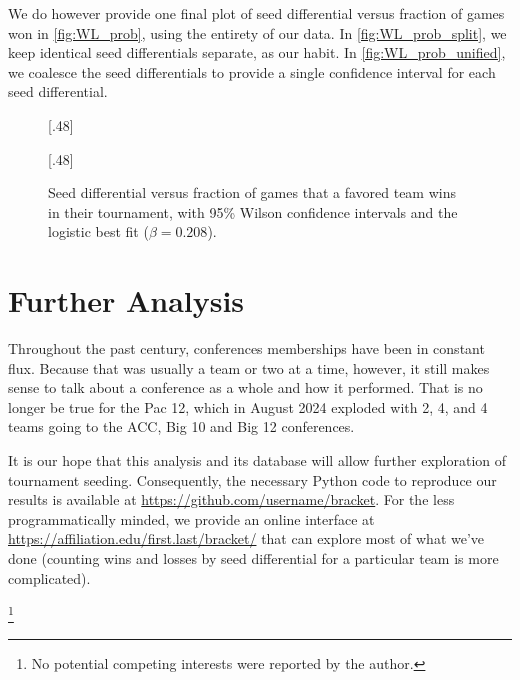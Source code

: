 \documentclass{article}
\newcommand\githuburl{https://github.com/username/bracket}
\newcommand\interfaceurl{https://affiliation.edu/first.last/bracket/}
\begin{document}
We do however provide one final plot of seed differential versus fraction of games won in \autoref{fig:WL_prob}, using the entirety of our data.  In \autoref{fig:WL_prob_split}, we keep identical seed differentials separate, as our habit.  In \autoref{fig:WL_prob_unified}, we coalesce the seed differentials to provide a single confidence interval for each seed differential.
\begin{figure}
[.48\textwidth]{%
%
}\hfill
{}[.48\textwidth]{%
}%
\caption{\label{fig:WL_prob}Seed differential versus fraction of games that a favored team wins in their tournament, with 95\% Wilson confidence intervals and the logistic best fit ($\beta=0.208$).}
\end{figure}


\section{Further Analysis}

Throughout the past century, conferences memberships have been in constant flux.  Because that was usually a team or two at a time, however, it still makes sense to talk about a conference as a whole and how it performed.  That is no longer be true for the Pac 12, which in August 2024 exploded with 2, 4, and 4 teams going to the ACC, Big 10 and Big 12 conferences.

It is our hope that this analysis and its database will allow further exploration of tournament seeding.  Consequently, the necessary Python code to reproduce our results is available at \url{\githuburl}.  For the less programmatically minded, we provide an online interface at \url{\interfaceurl} that can explore most of what we've done (counting wins and losses by seed differential for a particular team is more complicated).
\bigskip

\thanks{No potential competing interests were reported by the author.}
\printbibliography
\end{document}
